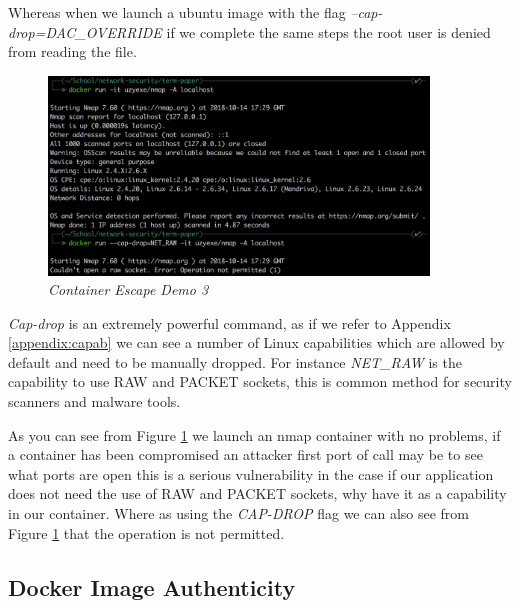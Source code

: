Whereas when we launch a ubuntu image with the flag \textit{--cap-drop=DAC\_OVERRIDE} if we complete the same steps the root user is denied from reading the file.

\begin{figure}[!ht]
\centering
\includegraphics*[width=0.9\textwidth]{images/term6.png}
\caption{\em Container Escape Demo 3}
\label{img:demo6}
\end{figure}

\textit{Cap-drop} is an extremely powerful command, as if we refer to Appendix \ref{appendix:capab} we can see a number of Linux capabilities which are allowed by default and need to be manually dropped. For instance \textit{NET\_RAW} is the capability to use RAW and PACKET sockets, this is common method for security scanners and malware tools. 



As you can see from Figure \ref{img:demo6} we launch an nmap container with no problems, if a container has been compromised an attacker first port of call may be to see what ports are open this is a serious vulnerability in the case if our application does not need the use of RAW and PACKET sockets, why have it as a capability in our container. Where as using the \textit{CAP-DROP} flag we can also see from Figure \ref{img:demo6} that the operation is not permitted.

\newpage
\subsection{Docker Image Authenticity}
\label{sub:authent}
